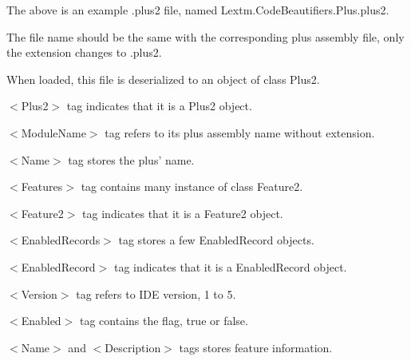 The above is an example .plus2 file, named Lextm.CodeBeautifiers.Pl\-us.pl\-us2.

The file name should be the same with the corresponding plus assembly file,
only the extension changes to .plus2.

When loaded, this file is deserialized to an object of class Plus2.

$<$Plus2$>$ tag indicates that it is a Plus2 object.

$<$ModuleName$>$ tag refers to its plus assembly name without extension.

$<$Name$>$ tag stores the plus' name.

$<$Features$>$ tag contains many instance of class Feature2.

$<$Feature2$>$ tag indicates that it is a Feature2 object.

$<$EnabledRecords$>$ tag stores a few EnabledRecord objects.

$<$EnabledRecord$>$ tag indicates that it is a EnabledRecord object.

$<$Version$>$ tag refers to IDE version, 1 to 5.

$<$Enabled$>$ tag contains the flag, true or false.

$<$Name$>$ and $<$Description$>$ tags stores feature information.